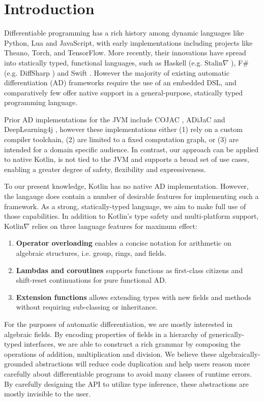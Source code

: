\section{Introduction}

Differentiable programming has a rich history among dynamic languages like Python, Lua and JavaScript, with early implementations including projects like Theano, Torch, and TensorFlow. More recently, their innovations have spread into statically typed, functional languages, such as Haskell (e.g. Stalin$\nabla$ \cite{c1}), F\# (e.g. DiffSharp \cite{c2}) and Swift \cite{c10}. However the majority of existing automatic differentiation (AD) frameworks require the use of an embedded DSL, and comparatively few offer native support in a general-purpose, statically typed programming language.

Prior AD implementations for the JVM include COJAC \cite{c6}, ADiJaC \cite{c7} and DeepLearning4j \cite{c8}, however these implementations either (1) rely on a custom compiler toolchain, (2) are limited to a fixed computation graph, or (3) are intended for a domain specific audience. In contrast, our approach can be applied to native Kotlin, is not tied to the JVM and supports a broad set of use cases, enabling a greater degree of safety, flexibility and expressiveness.

To our present knowledge, Kotlin has no native AD implementation. However, the langauge does contain a number of desirable features for implementing such a framework. As a strong, statically-typed language, we aim to make full use of those capabilities. In addition to Kotlin's type safety and multi-platform support, Kotlin$\nabla$ relies on three language features for maximum effect:

\begin{enumerate}
  \item \textbf{Operator overloading} enables a concise notation for arithmetic on algebraic structures, i.e. group, rings, and fields.
  \item \textbf{Lambdas and coroutines} supports functions as first-class citizens and shift-reset continuations for pure functional AD.
  \item \textbf{Extension functions} allows extending types with new fields and methods without requiring sub-classing or inheritance.
\end{enumerate}

For the purposes of automatic differentiation, we are mostly interested in algebraic fields. By encoding properties of fields in a hierarchy of generically-typed interfaces, we are able to construct a rich grammar by composing the operations of addition, multiplication and division. We believe these algebraically-grounded abstractions will reduce code duplication and help users reason more carefully about differentiable programs to avoid many classes of runtime errors. By carefully designing the API to utilize type inference, these abstractions are mostly invisible to the user.

